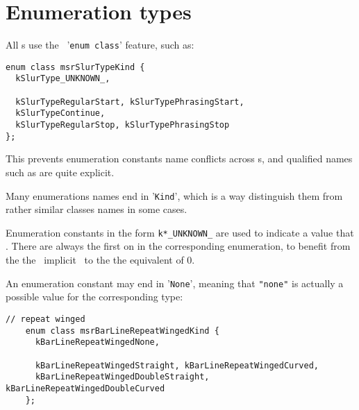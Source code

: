 \section{Enumeration types}

All \enumType s use the \CPlusplus\ '{\tt enum class}' feature, such as:

\begin{lstlisting}[language=CPlusPlus]
enum class msrSlurTypeKind {
  kSlurType_UNKNOWN_,

  kSlurTypeRegularStart, kSlurTypePhrasingStart,
  kSlurTypeContinue,
  kSlurTypeRegularStop, kSlurTypePhrasingStop
};
\end{lstlisting}

This prevents enumeration constants name conflicts across \enumType s, and qualified names such as  are quite explicit.

Many enumerations names end in '{\tt Kind}', which is a way distinguish them from rather similar classes names in some cases.

Enumeration constants in the form {\tt k*_UNKNOWN_} are used to indicate a value that . There are always the first on in the corresponding enumeration, to benefit from the the \CPlusplus\ implicit \initialization\  to the the equivalent of 0.

An enumeration constant may end in '{\tt None}', meaning that {\tt "none"} is actually a possible value for the corresponding type:
\begin{lstlisting}[language=CPlusPlus]
    // repeat winged
    enum class msrBarLineRepeatWingedKind {
      kBarLineRepeatWingedNone,

      kBarLineRepeatWingedStraight, kBarLineRepeatWingedCurved,
      kBarLineRepeatWingedDoubleStraight, kBarLineRepeatWingedDoubleCurved
    };
\end{lstlisting}

